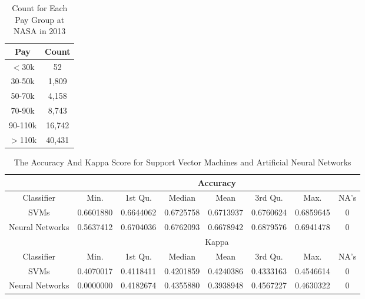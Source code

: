 \documentclass{article}
\begin{document}
    \begin{center}
        \begin{table}
            \centering
            \begin{tabular}{ |c|c| }
                \hline
                Pay & Count \\
                \hline
                $<$30k & 52 \\
                30-50k & 1,809 \\
                50-70k & 4,158 \\
                70-90k & 8,743 \\
                90-110k & 16,742 \\
                $>$110k & 40,431 \\
                \hline
            \end{tabular}
            \caption{Count for Each Pay Group at NASA in 2013}
            \label{tab:11}
        \end{table}
    \end{center}

    \begin{center}
        \begin{table}
            \centering
            \begin{tabular}{ |c|c|c|c|c|c|c|c| }
                \hline
                & \multicolumn{7}{|c|}{Accuracy} \\
                \hline
                Classifier & Min. & 1st Qu. & Median & Mean & 3rd Qu. & Max. & NA's \\
                SVMs & 0.6601880 & 0.6644062 & 0.6725758 & 0.6713937 & 0.6760624 & 0.6859645 & 0 \\
                Neural Networks & 0.5637412 & 0.6704036 & 0.6762093 & 0.6678942 & 0.6879576 & 0.6941478 & 0 \\
                \hline
                & \multicolumn{7}{|c|}{Kappa} \\
                \hline
                Classifier & Min. & 1st Qu. & Median & Mean & 3rd Qu. & Max. & NA's \\
                SVMs & 0.4070017 & 0.4118411 & 0.4201859 & 0.4240386 & 0.4333163 & 0.4546614 & 0 \\
                Neural Networks & 0.0000000 & 0.4182674 & 0.4355880 & 0.3938948 & 0.4567227 & 0.4630322 & 0 \\
                \hline
            \end{tabular}
            \caption{The Accuracy And Kappa Score for Support Vector Machines and Artificial Neural Networks}
            \label{tab:12}
        \end{table}
    \end{center}
\end{document}
